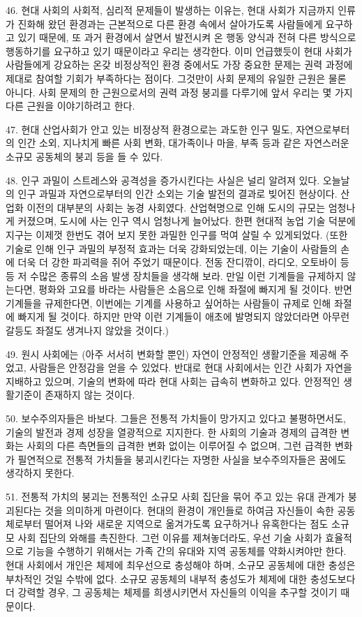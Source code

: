 \documentclass[11pt,a4paper]{article}
\begin{document}
\begin{multicols}{2}
46. 현대 사회의 사회적, 심리적 문제들이 발생하는 이유는, 현대 사회가 지금까지 인류가 진화해 왔던 환경과는 근본적으로 다른 환경 속에서 살아가도록 사람들에게 요구하고 있기 때문에, 또 과거 환경에서  살면서 발전시켜 온 행동 양식과 전혀 다른 방식으로 행동하기를 요구하고 있기 때문이라고 우리는  생각한다. 이미 언급했듯이 현대 사회가 사람들에게 강요하는 온갖 비정상적인 환경 중에서도 가장  중요한 문제는 권력 과정에 제대로 참여할 기회가 부족하다는 점이다. 그것만이 사회 문제의 유일한  근원은 물론 아니다. 사회 문제의 한 근원으로서의 권력 과정 붕괴를 다루기에 앞서 우리는 몇 가지 다른  근원을 이야기하려고 한다. 


47. 현대 산업사회가 안고 있는 비정상적 환경으로는 과도한 인구 밀도, 자연으로부터의 인간 소외,  지나치게 빠른 사회 변화, 대가족이나 마을, 부족 등과 같은 자연스러운 소규모 공동체의 붕괴 등을 들 수  있다. 


48. 인구 과밀이 스트레스와 공격성을 증가시킨다는 사실은 널리 알려져 있다. 오늘날의 인구 과밀과  자연으로부터의 인간 소외는 기술 발전의 결과로 빚어진 현상이다. 산업화 이전의 대부분의 사회는 농경  사회였다. 산업혁명으로 인해 도시의 규모는 엄청나게 커졌으며, 도시에 사는 인구 역시 엄청나게  늘어났다. 한편 현대적 농업 기술 덕분에 지구는 이제껏 한번도 겪어 보지 못한 과밀한 인구를 먹여 살릴  수 있게되었다. (또한 기술로 인해 인구 과밀의 부정적 효과는 더욱 강화되었는데, 이는 기술이 사람들의  손에 더욱 더 강한 파괴력을 쥐어 주었기 때문이다. 전동 잔디깎이, 라디오, 오토바이 등등 저 수많은  종류의 소음 발생 장치들을 생각해 보라. 만일 이런 기계들을 규제하지 않는다면, 평화와 고요를 바라는 
사람들은 소음으로 인해 좌절에 빠지게 될 것이다. 반면 기계들을 규제한다면, 이번에는 기계를 사용하고  싶어하는 사람들이 규제로 인해 좌절에 빠지게 될 것이다. 하지만 만약 이런 기계들이 애초에 발명되지  않았더라면 아무런 갈등도 좌절도 생겨나지 않았을 것이다.) 


49. 원시 사회에는 (아주 서서히 변화할 뿐인) 자연이 안정적인 생활기준을 제공해 주었고, 사람들은  안정감을 얻을 수 있었다. 반대로 현대 사회에서는 인간 사회가 자연을 지배하고 있으며, 기술의 변화에  따라 현대 사회는 급속히 변화하고 있다. 안정적인 생활기준이 존재하지 않는 것이다. 


50. 보수주의자들은 바보다. 그들은 전통적 가치들이 망가지고 있다고 불평하면서도, 기술의 발전과 경제 성장을 열광적으로 지지한다. 한 사회의 기술과 경제의 급격한 변화는 사회의 다른 측면들의 급격한 변화  없이는 이루어질 수 없으며, 그런 급격한 변화가 필연적으로 전통적 가치들을 붕괴시킨다는 자명한  사실을 보수주의자들은 꿈에도 생각하지 못한다. 


51. 전통적 가치의 붕괴는 전통적인 소규모 사회 집단을 묶어 주고 있는 유대 관계가 붕괴된다는 것을  의미하게 마련이다. 현대의 환경이 개인들로 하여금 자신들이 속한 공동체로부터 떨어져 나와 새로운  지역으로 옮겨가도록 요구하거나 유혹한다는 점도 소규모 사회 집단의 와해를 촉진한다. 그런 이유를  제쳐놓더라도, 우선 기술 사회가 효율적으로 기능을 수행하기 위해서는 가족 간의 유대와 지역 공동체를  
약화시켜야만 한다. 현대 사회에서 개인은 체제에 최우선으로 충성해야 하며, 소규모 공동체에 대한  충성은 부차적인 것일 수밖에 없다. 소규모 공동체의 내부적 충성도가 체제에 대한 충성도보다 더 강력할  경우, 그 공동체는 체제를 희생시키면서 자신들의 이익을 추구할 것이기 때문이다. 



\end{multicols}
\end{document}
